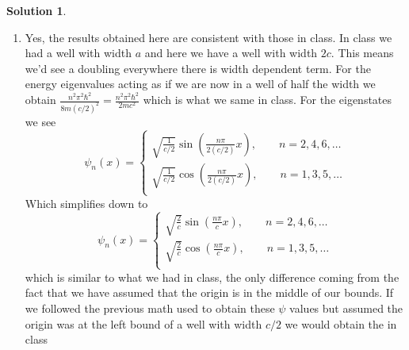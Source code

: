 \documentclass[10pt]{article}
\theoremstyle{definition}
\newtheorem{soln}{Solution}
\begin{document}
\begin{soln}
\begin{enumerate}[label=(\alph*)]
\begin{enumerate}[label=(\roman*)]
\begin{center}
                  \end{center}
            \item Yes, the results obtained here are consistent with those in class. In class we had a well with width $a$ and here we have a well with width
                  $2c$. This means we'd see a doubling everywhere there is width dependent term.
                  For the energy eigenvalues acting as if we are now in a well of half the width we obtain $\displaystyle\frac{n^2\pi^2\hbar^2}{8m(c/2)^2}=\frac{n^2\pi^2\hbar^2}{2mc^2}$
                  which is what we same in class. For the eigenstates we see
                  $$
                    \psi_n(x) =
                    \begin{cases}
                      \sqrt{\frac{1}{c/2}}\sin(\frac{n\pi}{2(c/2)}x),\qquad n=2,4,6,\dots \\
                      \sqrt{\frac{1}{c/2}}\cos(\frac{n\pi}{2(c/2)}x),\qquad n=1,3,5,\dots \\
                    \end{cases}
                  $$
                  Which simplifies down to
                  $$
                    \psi_n(x) =
                    \begin{cases}
                      \sqrt{\frac{2}{c}}\sin(\frac{n\pi}{c}x),\qquad n=2,4,6,\dots \\
                      \sqrt{\frac{2}{c}}\cos(\frac{n\pi}{c}x),\qquad n=1,3,5,\dots \\
                    \end{cases}
                  $$
                  which is similar to what we had in class, the only difference coming from the fact that we have assumed that the origin is in the middle of our bounds.
                  If we followed the previous math used to obtain these $\psi$ values but assumed the origin was at the left bound of a well with width $c/2$ we would obtain the in class

\end{enumerate}
\end{enumerate}
\end{soln}
\end{document}
